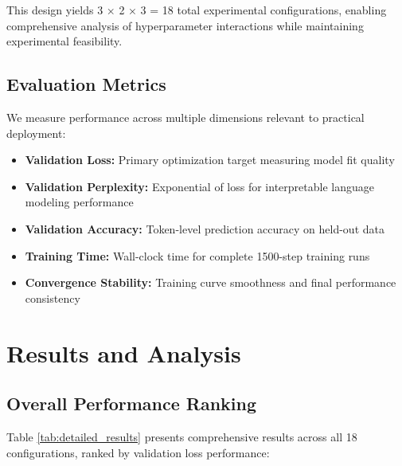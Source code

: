 \documentclass[11pt,a4paper]{article}
\begin{document}
This design yields 3 × 2 × 3 = 18 total experimental configurations, enabling comprehensive analysis of hyperparameter interactions while maintaining experimental feasibility.

\subsection{Evaluation Metrics}
We measure performance across multiple dimensions relevant to practical deployment:

\begin{itemize}
    \item \textbf{Validation Loss:} Primary optimization target measuring model fit quality
    \item \textbf{Validation Perplexity:} Exponential of loss for interpretable language modeling performance
    \item \textbf{Validation Accuracy:} Token-level prediction accuracy on held-out data
    \item \textbf{Training Time:} Wall-clock time for complete 1500-step training runs
    \item \textbf{Convergence Stability:} Training curve smoothness and final performance consistency
\end{itemize}

\section{Results and Analysis}

\subsection{Overall Performance Ranking}
Table \ref{tab:detailed_results} presents comprehensive results across all 18 configurations, ranked by validation loss performance:
\end{document}
